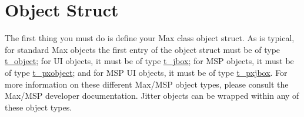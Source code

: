 \hypertarget{chapter_jit_maxwrappers_chapter_jit_maxwrappers_struct}{}\section{Object Struct}\label{chapter_jit_maxwrappers_chapter_jit_maxwrappers_struct}
The first thing you must do is define your Max class object struct. As is typical, for standard Max objects the first entry of the object struct must be of type \hyperlink{structt__object}{t\_\-object}; for UI objects, it must be of type \hyperlink{structt__jbox}{t\_\-jbox}; for MSP objects, it must be of type \hyperlink{structt__pxobject}{t\_\-pxobject}; and for MSP UI objects, it must be of type \hyperlink{structt__pxjbox}{t\_\-pxjbox}. For more information on these different Max/MSP object types, please consult the Max/MSP developer documentation. Jitter objects can be wrapped within any of these object types.

